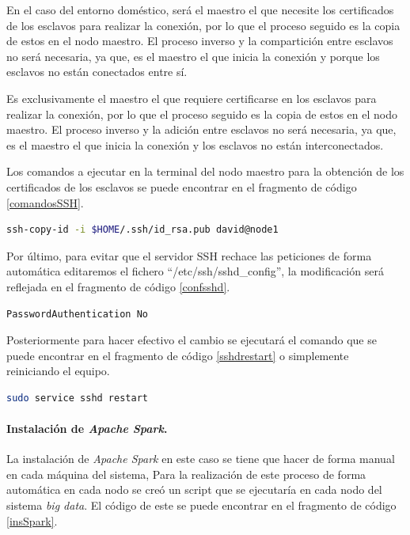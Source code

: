 En el caso del entorno doméstico, será el maestro el que necesite los certificados de los esclavos para realizar la conexión, por lo que el proceso seguido es la copia de estos en el nodo maestro. El proceso inverso y la compartición entre esclavos no será necesaria, ya que, es el maestro el que inicia la conexión y porque los esclavos no están conectados entre sí.

Es exclusivamente el maestro el que requiere certificarse en los esclavos para realizar la conexión, por lo que el proceso seguido es la copia de estos en el nodo maestro. El proceso inverso y la adición entre esclavos no será necesaria, ya que, es el maestro el que inicia la conexión y los esclavos no están interconectados.

Los comandos a ejecutar en la terminal del nodo maestro para la obtención de los certificados de los esclavos se puede encontrar en el fragmento de código \ref{comandosSSH}.

\begin{lstlisting}[label=comandosSSH,language=sh,frame=single,caption=Obtención de los certificados \gls{SSH} de los esclavos por parte del maestro en el clúster.]
ssh-copy-id -i $HOME/.ssh/id_rsa.pub david@node1
\end{lstlisting}

Por último, para evitar que el servidor \gls{SSH} rechace las peticiones de forma automática editaremos el fichero ``/etc/ssh/sshd\_config'', la modificación será reflejada en el fragmento de código \ref{confsshd}.

\begin{lstlisting}[label=confsshd,language=sh,frame=single,caption=Líneas modificadas en el fichero ``/etc/ssh/sshd\_config'' cada nodo del clúster.]
PasswordAuthentication No
\end{lstlisting}

Posteriormente para hacer efectivo el cambio se ejecutará el comando que se puede encontrar en el fragmento de código \ref{sshdrestart} o simplemente reiniciando el equipo.

\begin{lstlisting}[label=sshdrestart,language=sh,frame=single,caption=Comando de consola para reiniciar el servidor \gls{SSH}.]
sudo service sshd restart
\end{lstlisting}

\paragraph{Instalación de \textit{Apache Spark}.}
La instalación de \textit{Apache Spark} en este caso se tiene que hacer de forma manual en cada máquina del sistema,
Para la realización de este proceso de forma automática en cada nodo se creó un script que se ejecutaría en cada nodo del sistema \textit{big data}. El código de este se puede encontrar en el fragmento de código \ref{insSpark}.

